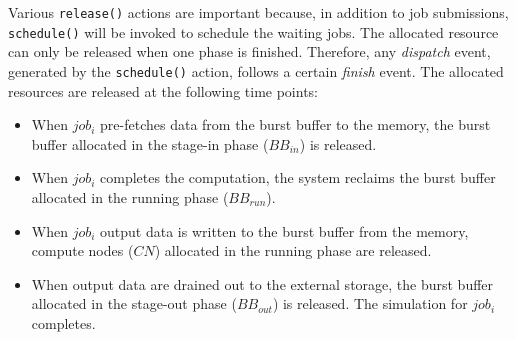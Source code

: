 Various \texttt{release()} actions are important because, in addition to job submissions,
\texttt{schedule()} will be invoked to schedule the waiting jobs.
The allocated resource can only be released when one phase is finished.
Therefore, any \textit{dispatch} event, generated by the \texttt{schedule()} action,
follows a certain \textit{finish} event.
The allocated resources are released at the following time points:
\begin{itemize}
        \item When $job_i$ pre-fetches data from the burst buffer to the memory,
                the burst buffer allocated in the stage-in phase ($BB_{in}$) is released.
        \item When $job_i$ completes the computation,
                the system reclaims the burst buffer allocated in the running phase ($BB_{run}$).
        \item When $job_i$ output data is written to the burst buffer from the memory,
              compute nodes ($CN$) allocated in the running phase are released.
        \item When output data are drained out to the external storage,
                the burst buffer allocated in the stage-out phase ($BB_{out}$) is released.
                The simulation for $job_i$ completes.
\end{itemize}




% 


